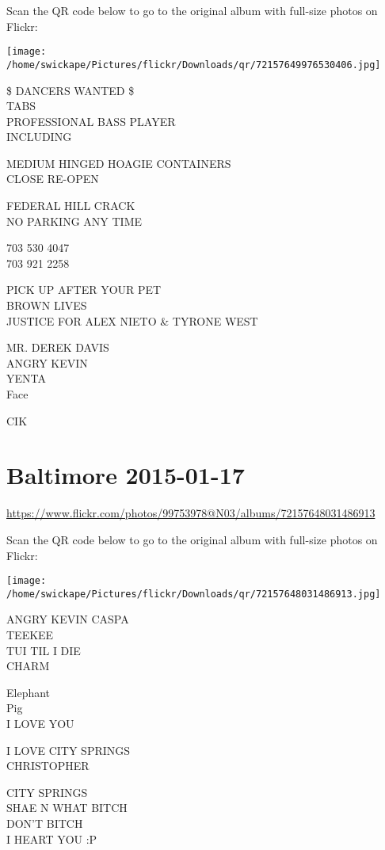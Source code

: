 \documentclass[10pt,letterpaper]{article}
\begin{document}
Scan the QR code below to go to the original album with full-size photos on Flickr:

\texttt{[image: /home/swickape/Pictures/flickr/Downloads/qr/72157649976530406.jpg]}


\$ DANCERS WANTED \$\\
TABS\\
PROFESSIONAL BASS PLAYER\\
INCLUDING

MEDIUM HINGED HOAGIE CONTAINERS\\
CLOSE RE{-}OPEN

FEDERAL HILL CRACK\\
NO PARKING ANY TIME

703 530 4047\\
703 921 2258

PICK UP AFTER YOUR PET\\
BROWN LIVES\\
JUSTICE FOR ALEX NIETO \& TYRONE WEST

MR. DEREK DAVIS\\
ANGRY KEVIN\\
YENTA\\
Face

CIK


\section*{Baltimore 2015-01-17}

\url{https://www.flickr.com/photos/99753978@N03/albums/72157648031486913}

Scan the QR code below to go to the original album with full-size photos on Flickr:

\texttt{[image: /home/swickape/Pictures/flickr/Downloads/qr/72157648031486913.jpg]}


ANGRY KEVIN CASPA\\
TEEKEE\\
TUI TIL I DIE\\
CHARM

Elephant\\
Pig\\
I LOVE YOU

I LOVE CITY SPRINGS\\
CHRISTOPHER

CITY SPRINGS\\
SHAE N WHAT BITCH\\
DON'T BITCH\\
I HEART YOU :P
\end{document}
